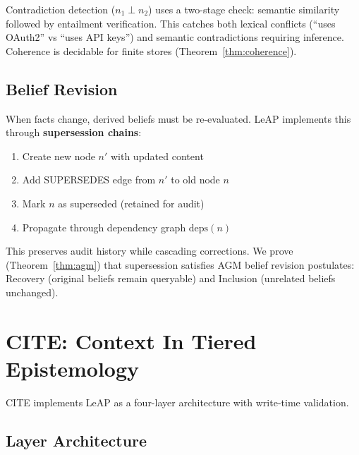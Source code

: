 \documentclass[11pt,letterpaper]{article}
\begin{document}
Contradiction detection ($n_1 \perp n_2$) uses a two-stage check: semantic similarity followed by entailment verification. This catches both lexical conflicts (``uses OAuth2'' vs ``uses API keys'') and semantic contradictions requiring inference. Coherence is decidable for finite stores (Theorem~\ref{thm:coherence}).

\subsection{Belief Revision}

When facts change, derived beliefs must be re-evaluated. LeAP implements this through \textbf{supersession chains}:

\begin{enumerate}[noitemsep]
    \item Create new node $n'$ with updated content
    \item Add SUPERSEDES edge from $n'$ to old node $n$
    \item Mark $n$ as superseded (retained for audit)
    \item Propagate through dependency graph $\text{deps}(n)$
\end{enumerate}

This preserves audit history while cascading corrections. We prove (Theorem~\ref{thm:agm}) that supersession satisfies AGM belief revision postulates: Recovery (original beliefs remain queryable) and Inclusion (unrelated beliefs unchanged).

\section{CITE: Context In Tiered Epistemology}
\label{sec:cite}

CITE implements LeAP as a four-layer architecture with write-time validation.

\subsection{Layer Architecture}
\end{document}
